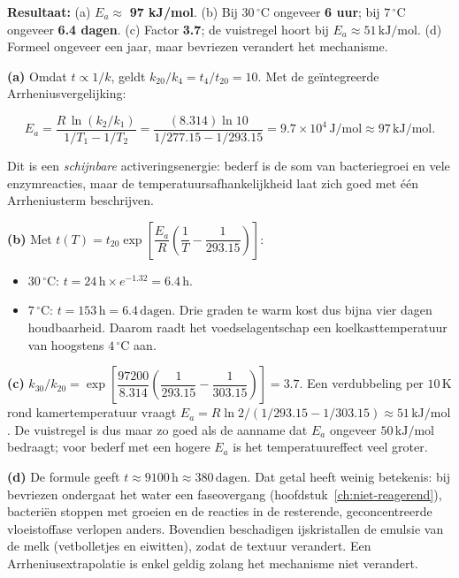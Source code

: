 \begin{oplossing}
\textbf{Resultaat:} (a) \(E_a \approx\) \textbf{97 kJ/mol}. (b) Bij \(30\,^\circ\mathrm{C}\) ongeveer \textbf{6 uur}; bij \(7\,^\circ\mathrm{C}\) ongeveer \textbf{6.4 dagen}. (c) Factor \textbf{3.7}; de vuistregel hoort bij \(E_a \approx 51\,\mathrm{kJ/mol}\). (d) Formeel ongeveer een jaar, maar bevriezen verandert het mechanisme.

\textbf{(a)} Omdat \(t \propto 1/k\), geldt \(k_{20}/k_4 = t_4/t_{20} = 10\). Met de geïntegreerde Arrheniusvergelijking:

\[
E_a = \frac{R\,\ln(k_2/k_1)}{1/T_1 - 1/T_2} = \frac{(8.314)\ln 10}{1/277.15 - 1/293.15} = 9.7\times10^{4}\,\mathrm{J/mol} \approx 97\,\mathrm{kJ/mol}.
\]

Dit is een \emph{schijnbare} activeringsenergie: bederf is de som van bacteriegroei en vele enzymreacties, maar de temperatuursafhankelijkheid laat zich goed met één Arrheniusterm beschrijven.

\textbf{(b)} Met \(t(T) = t_{20}\exp\!\left[\dfrac{E_a}{R}\left(\dfrac{1}{T} - \dfrac{1}{293.15}\right)\right]\):

\begin{itemize}
\item
  \(30\,^\circ\mathrm{C}\): \(t = 24\,\mathrm{h}\times e^{-1.32} = 6.4\,\mathrm{h}\).
\item
  \(7\,^\circ\mathrm{C}\): \(t = 153\,\mathrm{h} = 6.4\,\mathrm{dagen}\). Drie graden te warm kost dus bijna vier dagen houdbaarheid. Daarom raadt het voedselagentschap een koelkasttemperatuur van hoogstens \(4\,^\circ\mathrm{C}\) aan.
\end{itemize}

\textbf{(c)} \(k_{30}/k_{20} = \exp\!\left[\dfrac{97200}{8.314}\left(\dfrac{1}{293.15} - \dfrac{1}{303.15}\right)\right] = 3.7\). Een verdubbeling per \(10\,\mathrm{K}\) rond kamertemperatuur vraagt \(E_a = R\ln 2/(1/293.15 - 1/303.15) \approx 51\,\mathrm{kJ/mol}\). De vuistregel is dus maar zo goed als de aanname dat \(E_a\) ongeveer \(50\,\mathrm{kJ/mol}\) bedraagt; voor bederf met een hogere \(E_a\) is het temperatuureffect veel groter.

\textbf{(d)} De formule geeft \(t \approx 9100\,\mathrm{h} \approx 380\,\mathrm{dagen}\). Dat getal heeft weinig betekenis: bij bevriezen ondergaat het water een faseovergang (hoofdstuk~\ref{ch:niet-reagerend}), bacteriën stoppen met groeien en de reacties in de resterende, geconcentreerde vloeistoffase verlopen anders. Bovendien beschadigen ijskristallen de emulsie van de melk (vetbolletjes en eiwitten), zodat de textuur verandert. Een Arrheniusextrapolatie is enkel geldig zolang het mechanisme niet verandert.
\end{oplossing}

